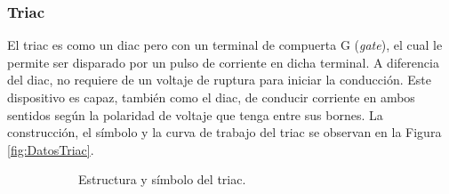     \subsubsection{Triac}
        
        El triac es como un diac pero con un terminal de compuerta G (\textit{gate}), 
        el cual le permite ser disparado por un pulso de corriente en dicha terminal.
        A diferencia del diac, no requiere de un voltaje de ruptura para iniciar 
        la conducción. 
        Este dispositivo es capaz, también como el diac, de conducir corriente en ambos
        sentidos según la polaridad de voltaje que tenga entre sus bornes. La construcción, 
        el símbolo y la curva de trabajo del triac se observan en la 
       Figura \ref{fig:DatosTriac}.


        \begin{figure}[H]
            \centering
            \begin{subfigure}[ht]{0.48\textwidth}
              \caption{Estructura y símbolo del triac.}
              \label{fig:EstrucTriac}
            \end{subfigure}
            \hfill 
            \begin{subfigure}[ht]{0.48\textwidth}

\end{subfigure}
\end{figure}
